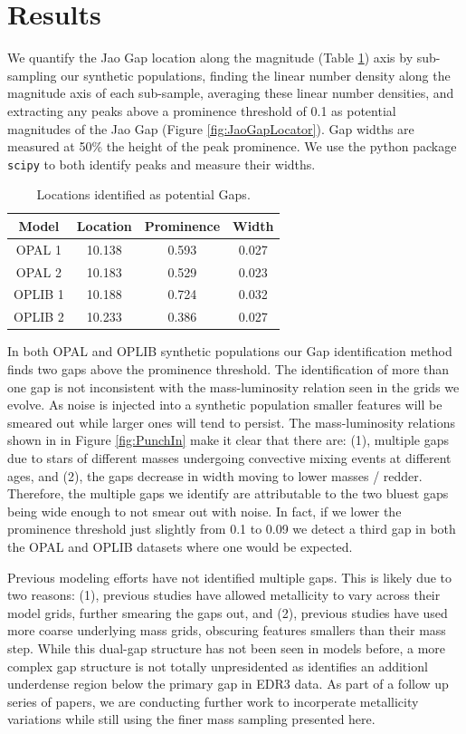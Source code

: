 \section{Results}\label{sec:results}
We quantify the Jao Gap location along the magnitude (Table
\ref{tab:GapLocation}) axis by sub-sampling our synthetic populations, finding
the linear number density along the magnitude axis of each sub-sample,
averaging these linear number densities, and extracting any peaks above a
prominence threshold of 0.1 as potential magnitudes of the Jao Gap (Figure
\ref{fig:JaoGapLocator}). Gap widths are measured at 50\% the height of the peak
prominence. We use the python package \texttt{scipy} \citep{2020SciPy-NMeth} to
both identify peaks and measure their widths. 

\begin{table}
	\centering
	\begin{tabular}{c | c c c}
		\hline
		Model & Location & Prominence & Width\\
		\hline
		\hline
		OPAL 1 & 10.138 & 0.593 & 0.027 \\
		OPAL 2 & 10.183 & 0.529 & 0.023 \\
		OPLIB 1 & 10.188 & 0.724 & 0.032 \\
		OPLIB 2 & 10.233 & 0.386 & 0.027 
	\end{tabular}
	\caption{Locations identified as potential Gaps.}
	\label{tab:GapLocation}
\end{table}

In both OPAL and OPLIB synthetic populations our Gap identification method
finds two gaps above the prominence threshold. The identification of more than
one gap is not inconsistent with the mass-luminosity relation seen in the grids
we evolve. As noise is injected into a synthetic population smaller features will
be smeared out while larger ones will tend to persist. The mass-luminosity
relations shown in in Figure \ref{fig:PunchIn} make it clear that there are: (1),
multiple gaps due to stars of different masses undergoing convective mixing
events at different ages, and (2), the gaps decrease in width moving to lower
masses / redder. Therefore, the multiple gaps we identify are attributable to
the two bluest gaps being wide enough to not smear out with noise. In fact, if
we lower the prominence threshold just slightly from 0.1 to 0.09 we detect a
third gap in both the OPAL and OPLIB datasets where one would be expected.

Previous modeling efforts \citep[e.g.][]{Feiden2021} have not identified
multiple gaps. This is likely due to two reasons: (1), previous studies have
allowed metallicity to vary across their model grids, further smearing the gaps
out, and (2), previous studies have used more coarse underlying mass grids,
obscuring features smallers than their mass step. While this dual-gap structure
has not been seen in models before, a more complex gap structure is not totally
unpresidented as \citet{Jao2021} identifies an additionl underdense region
below the primary gap in EDR3 data. As part of a follow up series of papers, we
are conducting further work to incorperate metallicity variations while still
using the finer mass sampling presented here.

